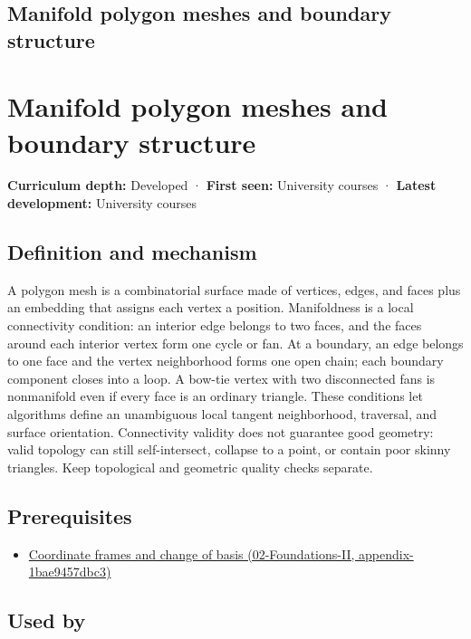 \hypertarget{appendix-fab348609369}{}
\section*{Manifold polygon meshes and boundary structure}
\chapter{Manifold polygon meshes and boundary structure}\label{appendix-fab348609369-manifold-polygon-meshes-and-boundary-structure}

\textbf{Curriculum depth:} Developed · \textbf{First seen:} University courses · \textbf{Latest development:} University courses

\section{Definition and mechanism}\label{appendix-fab348609369-definition-and-mechanism}

A polygon mesh is a combinatorial surface made of vertices, edges, and faces plus an embedding that assigns each vertex a position. Manifoldness is a local connectivity condition: an interior edge belongs to two faces, and the faces around each interior vertex form one cycle or fan. At a boundary, an edge belongs to one face and the vertex neighborhood forms one open chain; each boundary component closes into a loop. A bow-tie vertex with two disconnected fans is nonmanifold even if every face is an ordinary triangle. These conditions let algorithms define an unambiguous local tangent neighborhood, traversal, and surface orientation. Connectivity validity does not guarantee good geometry: valid topology can still self-intersect, collapse to a point, or contain poor skinny triangles. Keep topological and geometric quality checks separate.

\section{Prerequisites}\label{appendix-fab348609369-prerequisites}

\begin{itemize}
\tightlist
\item
  \href{../02-Foundations-II/main.pdf\#nameddest=appendix-1bae9457dbc3}{Coordinate frames and change of basis (02-Foundations-II, appendix-1bae9457dbc3)}
\end{itemize}

\section{Used by}\label{appendix-fab348609369-used-by}

